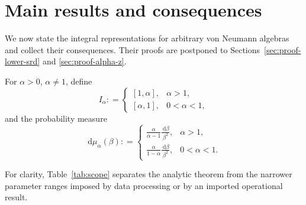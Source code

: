\documentclass[12pt]{article}
\numberwithin{equation}{section}
\theoremstyle{definition}
\theoremstyle{remark}
\newcommand{\dd}{\,\mathrm d}
\newcommand{\?}{\overset{?}{=}}
\newcommand{\defeq}{\mathrel{\mathop:}=}
\begin{document}
\section{Main results and consequences}
\label{sec:results-and-consequences}

We now state the integral representations for arbitrary von Neumann
algebras and collect their consequences.  Their proofs are postponed to
Sections~\ref{sec:proof-lower-srd} and \ref{sec:proof-alpha-z}.

For $\alpha>0$, $\alpha\ne1$, define
\begin{equation}
  I_\alpha
  \defeq \begin{cases}
     [1,\alpha],&\alpha>1,\\
     [\alpha,1],&0<\alpha<1,
     \end{cases}
  \label{eq:order-interval}
\end{equation}
and the probability measure
\begin{equation}
  \dd\mu_\alpha(\beta)
  \defeq \begin{cases}
  \displaystyle
  \frac{\alpha}{\alpha-1}\frac{\dd\beta}{\beta^2},
  &\alpha>1,\\[1.2ex]
  \displaystyle
  \frac{\alpha}{1-\alpha}\frac{\dd\beta}{\beta^2},
  &0<\alpha<1.
  \end{cases}
  \label{eq:order-probability-measure}
\end{equation}

For clarity, Table~\ref{tab:scope} separates the analytic theorem from
the narrower parameter ranges imposed by data processing or by an imported
operational result.
\end{document}
